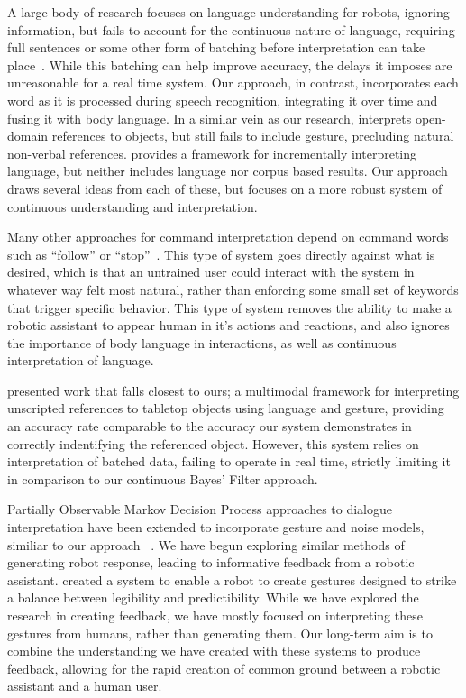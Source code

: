 \documentclass[a4paper, 11pt]{article} %
\begin{document}
A large body of research focuses on language understanding for robots, ignoring information, but fails to account for the continuous nature of language, requiring full sentences or some other form of batching before interpretation can take place~\citep{macmahon06, dzifcak09, kollar10, matuszek12}. While this batching can help improve accuracy, the delays it imposes are unreasonable for a real time system. Our approach, in contrast, incorporates each word as it is processed during speech recognition, integrating it over time and fusing it with body language. In a similar vein as our research, \citet{guadarrama14} interprets open-domain references to objects, but still fails to include gesture, precluding natural non-verbal references. \citet{cantrell10} provides a framework for incrementally interpreting language, but neither includes language nor corpus based results. Our approach draws several ideas from each of these, but focuses on a more robust system of continuous understanding and interpretation.

Many other approaches for command interpretation depend on command words such as ``follow'' or ``stop''~\citep{waldherr00, marge11}. This type of system goes directly against what is desired, which is that an untrained user could interact with the system in whatever way felt most natural, rather than enforcing some small set of keywords that trigger specific behavior. This type of system removes the ability to make a robotic assistant to appear human in it's actions and reactions, and also ignores the importance of body language in interactions, as well as continuous interpretation of language.

\citet{matuszek14} presented work that falls closest to ours; a multimodal framework for interpreting unscripted references to tabletop objects using language and gesture, providing an accuracy rate comparable to the accuracy our system demonstrates in correctly indentifying the referenced object. However, this system relies on interpretation of batched data, failing to operate in real time, strictly limiting it in comparison to our continuous Bayes' Filter approach.

Partially Observable Markov Decision Process approaches to dialogue interpretation have been extended to incorporate gesture and noise models, similiar to our approach~\citep{young13, young10} . We have begun exploring similar methods of generating robot response, leading to informative feedback from a robotic assistant. \citet{dragan13} created a system to enable a robot to create gestures designed to strike a balance between legibility and predictibility. While we have explored the research in creating feedback, we have mostly focused on interpreting these gestures from humans, rather than generating them. Our long-term aim is to combine the understanding we have created with these systems to produce feedback, allowing for the rapid creation of common ground between a robotic assistant and a human user.
\end{document}
